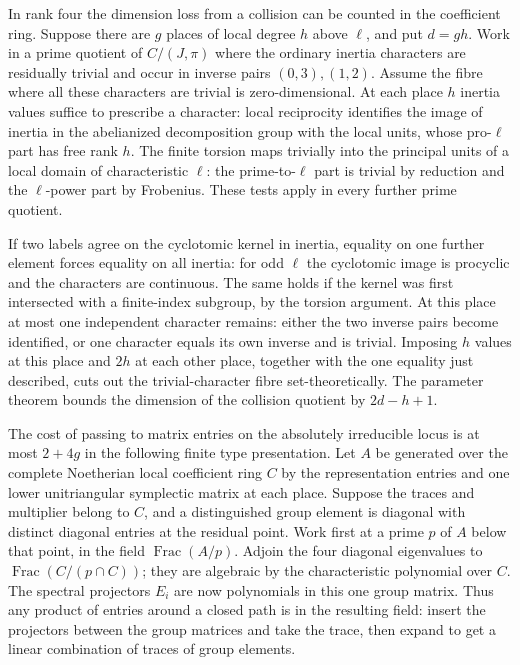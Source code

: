 \documentclass[11pt]{amsart}
\theoremstyle{definition}
\theoremstyle{remark}
\begin{document}
In rank four the dimension loss from a collision can be counted
in the coefficient ring. Suppose there are $g$ places of local
degree $h$ above $\ell$, and put $d=gh$. Work in a prime quotient
of $C/(J,\pi)$ where the ordinary inertia characters are residually
trivial and occur in inverse pairs $(0,3),(1,2)$. Assume the fibre
where all these characters are trivial is zero-dimensional.
At each place $h$ inertia values suffice to prescribe a character:
local reciprocity identifies the image of inertia in the abelianized
decomposition group with the local units, whose pro-$\ell$ part has free rank
$h$. The finite torsion maps trivially into the principal units of
a local domain of characteristic $\ell$: the prime-to-$\ell$ part
is trivial by reduction and the $\ell$-power part by Frobenius.
These tests apply in every further prime quotient.

If two labels agree on the cyclotomic kernel in inertia, equality
on one further element forces equality on all inertia: for odd
$\ell$ the cyclotomic image is procyclic and the characters are
continuous. The same holds if the kernel was first intersected
with a finite-index subgroup, by the torsion argument. At this
place at most one independent character remains: either the two
inverse pairs become identified, or one character equals its own
inverse and is trivial. Imposing $h$ values at this place and
$2h$ at each other place, together with the one equality just
described, cuts out the trivial-character fibre set-theoretically.
The parameter theorem bounds the dimension of the collision
quotient by $2d-h+1$.

The cost of passing to matrix entries on the absolutely irreducible
locus is at most $2+4g$ in the following finite type presentation.
Let $A$ be generated over the complete Noetherian local coefficient ring $C$
by the representation entries and one lower unitriangular symplectic
matrix at each place. Suppose the traces and multiplier belong to
$C$, and a distinguished group element is diagonal with distinct
diagonal entries at the residual point. Work first at a prime $p$ of
$A$ below that point, in the field $\operatorname{Frac}(A/p)$.
Adjoin the four diagonal eigenvalues to $\operatorname{Frac}(C/(p\cap C))$;
they are algebraic by the characteristic polynomial over $C$.
The spectral projectors $E_i$ are now polynomials in this one group
matrix. Thus any product of entries around a closed path is in the
resulting field: insert the projectors between the group matrices
and take the trace, then expand to get a linear combination of
traces of group elements.
\end{document}
